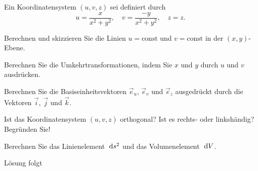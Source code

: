\documentclass{atistandalonetask}
\begin{document}
  \begin{atiTask}[
    title = Koordinatentransformation
  ]

Ein Koordinatensystem $(u,v,z)$ sei definiert durch
\[
u=\frac{x}{x^2+y^2},\quad v=\frac{-y}{x^2+y^2},\quad z=z.
\]
	\begin{atiSubtasks}
		\item Berechnen und skizzieren Sie die Linien $u=\text{const}$ und $v=\text{const}$ in der $(x,y)$-Ebene.
		\item Berechnen Sie die Umkehrtransformationen, indem Sie $x$ und $y$ durch $u$ und $v$ ausdrücken.
		\item Berechnen Sie die Basiseinheitsvektoren $\vec{e}_u$, $\vec{e}_v$ und $\vec{e}_z$ ausgedrückt durch die Vektoren $\vec{i}$, $\vec{j}$ und $\vec{k}$.
		\item Ist das Koordinatensystem $(u,v,z)$ orthogonal? Ist es rechts- oder linkshändig? Begründen Sie!
		\item Berechnen Sie das Linienelement $\;\mathrm{d} s^2$ und das Volumenelement $\;\mathrm{d} V$.
	\end{atiSubtasks} 
  \end{atiTask}
  \begin{atiSolution}
  Lösung folgt
  \end{atiSolution}
\end{document}
